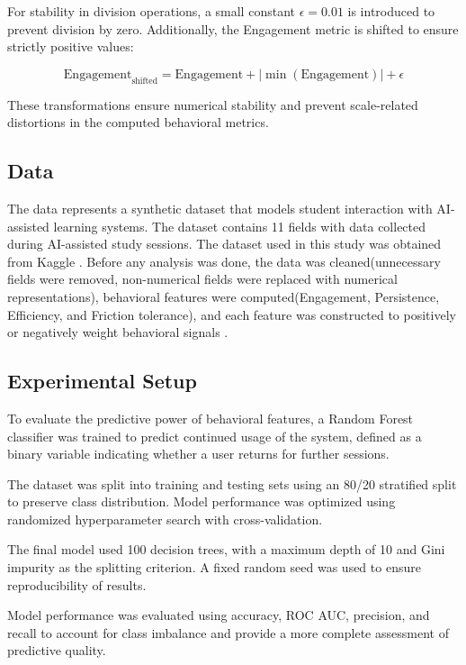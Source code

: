 \documentclass{article}
\begin{document}
For stability in division operations, a small constant \( \epsilon = 0.01 \) is introduced to prevent division by zero. Additionally, the Engagement metric is shifted to ensure strictly positive values:

\[
\text{Engagement}_{\text{shifted}} = \text{Engagement} + |\min(\text{Engagement})| + \epsilon
\]

These transformations ensure numerical stability and prevent scale-related distortions in the computed behavioral metrics.

\subsection{Data}

The data represents a synthetic dataset that models student interaction with AI-assisted learning systems. The dataset contains 11 fields with data collected during AI-assisted study sessions. The dataset used in this study was obtained from Kaggle \cite{ai_learning_dataset}. Before any analysis was done, the data was cleaned(unnecessary fields were removed, non-numerical fields were replaced with numerical representations), behavioral features were computed(Engagement, Persistence, Efficiency, and Friction tolerance), and each feature was constructed to positively or negatively weight behavioral signals \cite{baker2014educational}.

\subsection{Experimental Setup}

To evaluate the predictive power of behavioral features, a Random Forest classifier \cite{breiman2001random} was trained to predict continued usage of the system, defined as a binary variable indicating whether a user returns for further sessions.

The dataset was split into training and testing sets using an 80/20 stratified split to preserve class distribution. Model performance was optimized using randomized hyperparameter search with cross-validation.

The final model used 100 decision trees, with a maximum depth of 10 and Gini impurity as the splitting criterion. A fixed random seed was used to ensure reproducibility of results.

Model performance was evaluated using accuracy, ROC AUC, precision, and recall to account for class imbalance and provide a more complete assessment of predictive quality.
\end{document}
